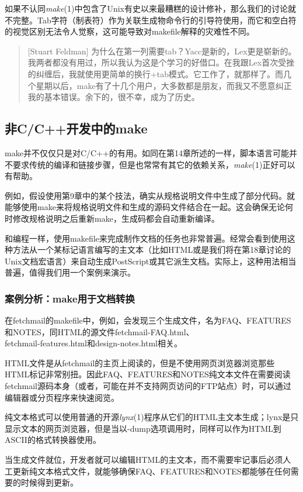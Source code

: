 \documentclass[12pt,oneside]{book}
\begin{document}
如果不认同\textit{make}(1)中包含了Unix有史以来最糟糕的设计修补，那么我们的讨论就不完整。Tab字符（制表符）作为关联生成物命令行的引导符使用，而它和空白符的视觉区别无法令人觉察，这可能导致对makefile解释的灾难性不同。

\begin{quote}[Stuart Feldman]
为什么在第一列需要tab？Yacc是新的，Lex更是崭新的。我两者都没有用过，所以我认为这是个学习的好借口。在我跟Lex首次受挫的纠缠后，我就使用更简单的换行+tab模式。它工作了，就那样了。而几个星期以后，make有了十几个用户，大多数都是朋友，而我又不愿意纠正我的基本错误。余下的，很不幸，成为了历史。
\end{quote}


\subsection{非C/C++开发中的make}
make并不仅仅只是对C/C++的有用。如同在第14章所述的一样，脚本语言可能并不要求传统的编译和链接步骤，但是也常常有其它的依赖关系，\textit{make}(1)正好可以有帮助。

例如，假设使用第9章中的某个技法，确实从规格说明文件中生成了部分代码。就能够使用make来将规格说明文件和生成的源码文件结合在一起。这会确保无论何时修改规格说明之后重新make，生成码都会自动重新编译。

和编程一样，使用makefile来完成制作文档的任务也非常普遍。经常会看到使用这种方法从一个某标记语言编写的主文本（比如HTML或是我们将在第18章讨论的Unix文档宏语言）来自动生成PostScript或其它派生文档。实际上，这种用法相当普遍，值得我们用一个案例来演示。

\subsubsection{案例分析：make用于文档转换}
在fetchmail的makefile中，例如，会发现三个生成文件，名为FAQ、FEATURES和NOTES，同HTML的源文件fetchmail-FAQ.html、\\ fetchmail-features.html和design-notes.html相关。

HTML文件是从fetchmail的主页上阅读的，但是不使用网页浏览器浏览那些HTML标记非常别扭。因此FAQ、FEATURES和NOTES纯文本文件在需要阅读fetchmail源码本身（或者，可能在并不支持网页访问的FTP站点）时，可以通过编辑器或分页程序来快速阅览。

纯文本格式可以使用普通的开源\textit{lynx}(1)程序从它们的HTML主文本生成；lynx是只显示文本的网页浏览器，但是当以-dump选项调用时，同样可以作为HTML到ASCII的格式转换器使用。

当生成文件就位，开发者就可以编辑HTML的主文本，而不需要牢记事后必须人工更新纯文本格式文件，就能够确保FAQ、FEATURES和NOTES都能够在任何需要的时候得到更新。
\end{document}

